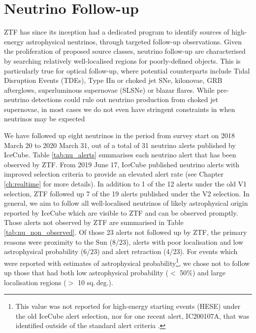\section{Neutrino Follow-up}
ZTF has since its inception had a dedicated program to identify sources of high-energy astrophysical neutrinos, through targeted follow-up observations. Given the proliferation of proposed source classes, neutrino follow-up are characterised by searching relatively well-localised regions for poorly-defined objects. This is particularly true for optical follow-up, where potential counterparts include Tidal Disruption Events (TDEs), Type IIn or choked jet SNe, kilonovae, GRB afterglows, superluminous supernovae (SLSNe) or blazar flares. While pre-neutrino detections could rule out neutrino production from choked jet supernovae, in most cases we do not even have stringent constraints in when neutrinos may be expected 

 We have followed up eight neutrinos in the period from survey start on 2018 March 20 to 2020 March 31, out of a total of 31 neutrino alerts published by IceCube. Table \ref{tab:nu_alerts} summarises each neutrino alert that has been observed by ZTF. From 2019 June 17, IceCube published neutrino alerts with improved selection criteria to provide an elevated alert rate  (see Chapter \ref{ch:realtime} for more details). In addition to 1 of the 12 alerts under the old V1 selection, ZTF followed up 7 of the 19 alerts published under the V2 selection. In general, we aim to follow all well-localised neutrinos of likely astrophysical origin reported by IceCube which are visible to ZTF and can be observed promptly. Those alerts not observed by ZTF are summarised in Table \ref{tab:nu_non_observed}. Of those 23 alerts not followed up by ZTF, the primary reasons were proximity to the Sun (8/23), alerts with poor localisation and low astrophysical probability (6/23) and alert retraction (4/23). For events which were reported with estimates of astrophysical probability\footnote{This value was not reported for high-energy starting events (HESE) under the old IceCube alert selection, nor for one recent alert, IC200107A, that was identified outside of the standard alert criteria .}, we chose not to follow up those that had both low astrophysical probability ($<$ 50\%) and large localisation regions ($>$ 10 sq.\,deg.).

